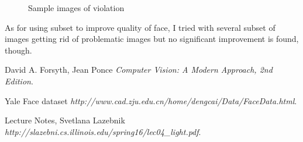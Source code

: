 \documentclass[a4paper]{article}
\begin{document}
\begin{figure}[h!]
\centering
{}
\caption{Sample images of violation\label{fig:vio}}
\end{figure}

As for using subset to improve quality of face, I tried with several subset of images getting rid of problematic images but no significant improvement is found, though.
\begin{thebibliography}{12}
 David A. Forsyth, Jean Ponce 
  \emph{Computer Vision: A Modern Approach, 2nd Edition}.
  
Yale Face dataset
  \emph{http://www.cad.zju.edu.cn/home/dengcai/Data/FaceData.html}.

Lecture Notes, Svetlana Lazebnik
	\emph{http://slazebni.cs.illinois.edu/spring16/lec04\_light.pdf}.
    
\end{thebibliography}
\end{document}
